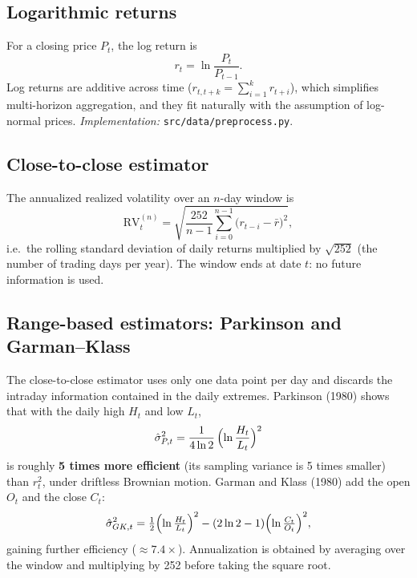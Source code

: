 \documentclass[11pt,a4paper]{article}
\newcommand{\RV}{\mathrm{RV}}
\begin{document}
\subsection{Logarithmic returns}

For a closing price $P_t$, the log return is
\begin{equation}
r_t = \ln\frac{P_t}{P_{t-1}}.
\end{equation}
Log returns are additive across time
($r_{t,t+k} = \sum_{i=1}^{k} r_{t+i}$), which simplifies multi-horizon
aggregation, and they fit naturally with the assumption of log-normal prices.
\emph{Implementation:} \texttt{src/data/preprocess.py}.

\subsection{Close-to-close estimator}

The annualized realized volatility over an $n$-day window is
\begin{equation}
\RV_t^{(n)} = \sqrt{\frac{252}{n-1}\sum_{i=0}^{n-1}\bigl(r_{t-i}-\bar{r}\bigr)^2},
\end{equation}
i.e.\ the rolling standard deviation of daily returns multiplied by
$\sqrt{252}$ (the number of trading days per year). The window ends at date
$t$: no future information is used.

\subsection{Range-based estimators: Parkinson and Garman--Klass}
\label{sec:range}

The close-to-close estimator uses only one data point per day and discards
the intraday information contained in the daily extremes. Parkinson (1980)
shows that with the daily high $H_t$ and low $L_t$,
\begin{equation}
\hat{\sigma}^2_{P,t} = \frac{1}{4\ln 2}\,\Bigl(\ln\frac{H_t}{L_t}\Bigr)^2
\end{equation}
is roughly \textbf{5 times more efficient} (its sampling variance is 5 times
smaller) than $r_t^2$, under driftless Brownian motion. Garman and Klass
(1980) add the open $O_t$ and the close $C_t$:
\begin{equation}
\hat{\sigma}^2_{GK,t} = \tfrac{1}{2}\Bigl(\ln\tfrac{H_t}{L_t}\Bigr)^2
- (2\ln 2 - 1)\Bigl(\ln\tfrac{C_t}{O_t}\Bigr)^2,
\end{equation}
gaining further efficiency ($\approx 7.4\times$). Annualization is obtained
by averaging over the window and multiplying by 252 before taking the square
root.
\end{document}
